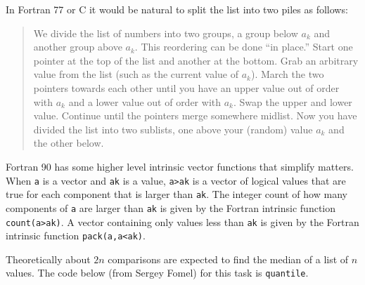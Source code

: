 \par
In Fortran 77 or C it would be natural to split the list
into two piles as follows:
\begin{quotation}
We divide the list of numbers into two groups,
a group below $a_k$ and another group above $a_k$.
This reordering can be done ``in place.''
Start one pointer at the top of the list and another at the bottom.
Grab an arbitrary value from the list
(such as the current value of $a_k$).
March the two pointers towards each other
until you have an upper value out of order with $a_k$
and a lower value out of order with $a_k$.
Swap the upper and lower value.
Continue until the pointers merge somewhere midlist.
Now you have divided the list into two sublists,
one above your (random) value $a_k$ and the other below.
\end{quotation}
Fortran 90 has some higher level intrinsic vector functions
that simplify matters.
When \texttt{a} is a vector and \texttt{ak}
is a value,
\texttt{a>ak} is a vector of logical values that
are true for each component that is larger than \texttt{ak}.
The integer count of how many components
of \texttt{a} are larger than \texttt{ak}
is given by the Fortran intrinsic function \texttt{count(a>ak)}.
A vector containing only values less than \texttt{ak}
is given by the Fortran intrinsic function \texttt{pack(a,a<ak)}.

\par
Theoretically about $2n$ comparisons
are expected to find the median of a list of $n$ values.
The code below (from Sergey Fomel)
for this task is \texttt{quantile}.


